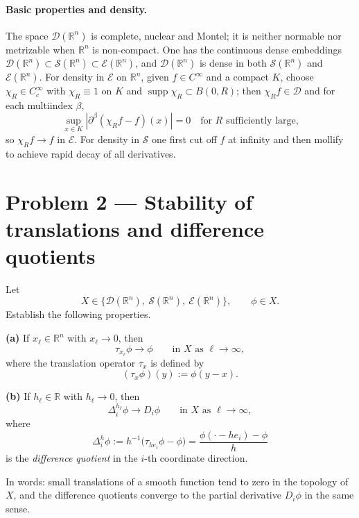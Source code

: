 \documentclass[12pt,a4paper]{article}
\theoremstyle{plain}
\theoremstyle{definition}
\theoremstyle{remark}
\theoremstyle{remark}
\begin{document}
\paragraph{Basic properties and density.}
The space $\mathcal{D}(\mathbb{R}^n)$ is complete, nuclear and Montel; it is neither normable nor metrizable when $\mathbb{R}^n$ is non-compact.
One has the continuous dense embeddings $\mathcal{D}(\mathbb{R}^n)\subset \mathcal{S}(\mathbb{R}^n)\subset \mathcal{E}(\mathbb{R}^n)$, and $\mathcal{D}(\mathbb{R}^n)$ is dense in both $\mathcal{S}(\mathbb{R}^n)$ and $\mathcal{E}(\mathbb{R}^n)$.
For density in $\mathcal{E}$ on $\mathbb{R}^n$, given $f\in C^\infty$ and a compact $K$, choose $\chi_R\in C_c^\infty$ with $\chi_R\equiv1$ on $K$ and $\operatorname{supp}\chi_R\subset B(0,R)$; then $\chi_R f\in \mathcal{D}$ and for each multiindex $\beta$,
\[
\sup_{x\in K}|\partial^\beta(\chi_R f - f)(x)|=0\quad \text{for $R$ sufficiently large,}
\]
so $\chi_R f\to f$ in $\mathcal{E}$. 
For density in $\mathcal{S}$ one first cut off $f$ at infinity and then mollify to achieve rapid decay of all derivatives.

\section*{Problem 2 — Stability of translations and difference quotients}


Let
\[
X\in\bigl\{\mathcal D(\mathbb R^n),\ \mathcal S(\mathbb R^n),\ \mathcal E(\mathbb R^n)\bigr\},
\qquad \phi\in X.
\]
Establish the following properties.

\bigskip

\textbf{(a)} If $x_\ell\in\mathbb R^n$ with $x_\ell\to0$, then
\[
\tau_{x_\ell}\phi\longrightarrow\phi
\qquad\text{in }X\text{ as }\ell\to\infty,
\]
where the translation operator $\tau_x$ is defined by
\[
(\tau_x\phi)(y):=\phi(y-x).
\]

\bigskip

\textbf{(b)} If $h_\ell\in\mathbb R$ with $h_\ell\to0$, then
\[
\Delta_i^{h_\ell}\phi\longrightarrow D_i\phi
\qquad\text{in }X\text{ as }\ell\to\infty,
\]
where
\[
\Delta_i^{h}\phi
:=h^{-1}\bigl(\tau_{h e_i}\phi-\phi\bigr)
=\frac{\phi(\cdot-h e_i)-\phi}{h}
\]
is the \emph{difference quotient} in the $i$-th coordinate direction.

\bigskip

In words: small translations of a smooth function tend to zero in the topology of $X$, and the difference quotients converge to the partial derivative $D_i\phi$ in the same sense.
\end{document}
